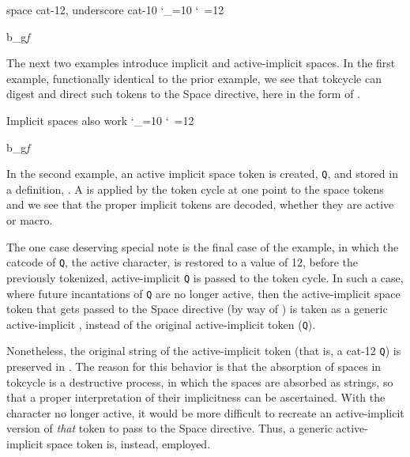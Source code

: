 \documentclass[10pt]{article}
\newcommand\TokCycle{\textsf{tokcycle}}
\begin{document}
%

\begin{exampleA}[lefthand width=10cm]{space cat-12{,} underscore cat-10}
\catcode`\_=10 %
\catcode`\ =12 %

%
{}%
{}%
{}%
 b_g\itshape f\upshape\endtokencycle
\end{exampleA}

The next two examples introduce implicit and active-implicit spaces.
In the first example, functionally identical to the prior example, 
  we see that \TokCycle{} can digest and direct such 
  tokens to the Space directive, here in the form of .

\resettokcycle
{}

\begin{exampleA}[lefthand width=10cm]{Implicit spaces also work}
\resettokcycle
{}
\def\:{\let\z= } \: %
\catcode`\_=10 %
\catcode`\ =12 %

\tokencyclexpress
\fbox{a\z{}c d} b_g\itshape f\upshape
\endtokencyclexpress
\end{exampleA}

In the second example, an active implicit space token is created, \texttt{Q},
  and stored in a definition, .
A  is applied by the token cycle at one point to the
  space tokens and we see that the proper implicit tokens are decoded, whether
  they are active or macro.

\medskip
The one case deserving special note is the final case of the example,
  in which the catcode of \texttt{Q}, the active character, is restored
  to a value of 12, before the previously tokenized, active-implicit
  \texttt{Q} is passed to the token cycle.
In such a case, where future incantations of \texttt{Q} are no longer active,
  then the active-implicit space token that gets passed to the 
  Space directive (by way of ) is taken as a generic 
  active-implicit , instead of the original 
  active-implicit token (\texttt{Q}).

\medskip
Nonetheless, the original string of the active-implicit token (that is, a
  cat-12 \texttt{Q}) is preserved in .
The reason for this behavior is that the absorption of spaces in \TokCycle{}
  is a destructive process, in which the spaces are absorbed as strings,
  so that a proper interpretation of their implicitness can be ascertained.
With the character no longer active, it would be more difficult to 
  recreate an active-implicit version of \textit{that} token to
  pass to the Space directive.
Thus, a generic active-implicit space token is, instead, employed.
\end{document}
